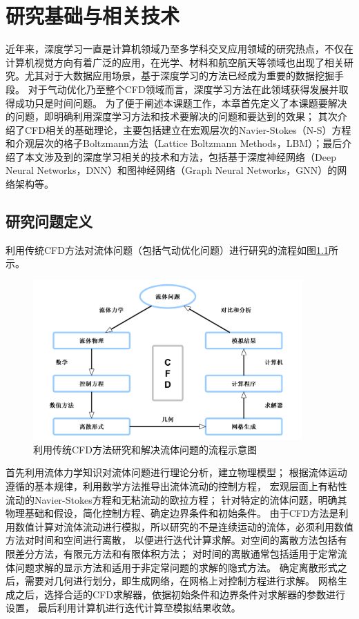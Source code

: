 \chapter{研究基础与相关技术}

近年来，深度学习一直是计算机领域乃至多学科交叉应用领域的研究热点，不仅在计算机视觉方向有着广泛的应用，在光学、材料和航空航天等领域也出现了相关研究。尤其对于大数据应用场景，基于深度学习的方法已经成为重要的数据挖掘手段。
对于气动优化乃至整个CFD领域而言，深度学习方法在此领域获得发展并取得成功只是时间问题。
为了便于阐述本课题工作，本章首先定义了本课题要解决的问题，即明确利用深度学习方法和技术要解决的问题和要达到的效果；
其次介绍了CFD相关的基础理论，主要包括建立在宏观层次的Navier-Stokes（N-S）方程和介观层次的格子Boltzmann方法（Lattice Boltzmann Methods，LBM）；最后介绍了本文涉及到的深度学习相关的技术和方法，包括基于深度神经网络（Deep Neural Networks，DNN）和图神经网络（Graph  Neural Networks，GNN）的网络架构等。

\section{研究问题定义}
利用传统CFD方法对流体问题（包括气动优化问题）进行研究的流程如图\ref{fig:cfdflow}所示。
\begin{figure}[htp]
	\centering
	\includegraphics[width=0.92\textwidth]{figures/cfdflow.pdf}
	\caption{利用传统CFD方法研究和解决流体问题的流程示意图}
	\label{fig:cfdflow}
\end{figure}


首先利用流体力学知识对流体问题进行理论分析，建立物理模型；
根据流体运动遵循的基本规律，利用数学方法推导出流体流动的控制方程，
宏观层面上有粘性流动的Navier-Stokes方程和无粘流动的欧拉方程；
针对特定的流体问题，明确其物理基础和假设，简化控制方程、确定边界条件和初始条件。
由于CFD方法是利用数值计算对流体流动进行模拟，所以研究的不是连续运动的流体，必须利用数值方法对时间和空间进行离散，
以便进行迭代计算求解。对空间的离散方法包括有限差分方法，有限元方法和有限体积方法；
对时间的离散通常包括适用于定常流体问题求解的显示方法和适用于非定常问题的求解的隐式方法。
确定离散形式之后，需要对几何进行划分，即生成网络，在网格上对控制方程进行求解。
网格生成之后，选择合适的CFD求解器，依据初始条件和边界条件对求解器的参数进行设置，
最后利用计算机进行迭代计算至模拟结果收敛。



